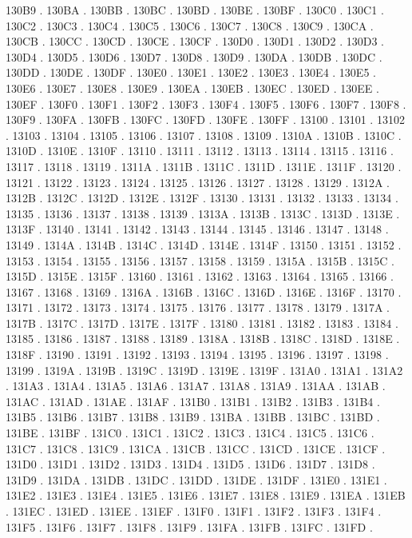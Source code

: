 130B9 .
130BA .
130BB .
130BC .
130BD .
130BE .
130BF .
130C0 .
130C1 .
130C2 .
130C3 .
130C4 .
130C5 .
130C6 .
130C7 .
130C8 .
130C9 .
130CA .
130CB .
130CC .
130CD .
130CE .
130CF .
130D0 .
130D1 .
130D2 .
130D3 .
130D4 .
130D5 .
130D6 .
130D7 .
130D8 .
130D9 .
130DA .
130DB .
130DC .
130DD .
130DE .
130DF .
130E0 .
130E1 .
130E2 .
130E3 .
130E4 .
130E5 .
130E6 .
130E7 .
130E8 .
130E9 .
130EA .
130EB .
130EC .
130ED .
130EE .
130EF .
130F0 .
130F1 .
130F2 .
130F3 .
130F4 .
130F5 .
130F6 .
130F7 .
130F8 .
130F9 .
130FA .
130FB .
130FC .
130FD .
130FE .
130FF .
13100 .
13101 .
13102 .
13103 .
13104 .
13105 .
13106 .
13107 .
13108 .
13109 .
1310A .
1310B .
1310C .
1310D .
1310E .
1310F .
13110 .
13111 .
13112 .
13113 .
13114 .
13115 .
13116 .
13117 .
13118 .
13119 .
1311A .
1311B .
1311C .
1311D .
1311E .
1311F .
13120 .
13121 .
13122 .
13123 .
13124 .
13125 .
13126 .
13127 .
13128 .
13129 .
1312A .
1312B .
1312C .
1312D .
1312E .
1312F .
13130 .
13131 .
13132 .
13133 .
13134 .
13135 .
13136 .
13137 .
13138 .
13139 .
1313A .
1313B .
1313C .
1313D .
1313E .
1313F .
13140 .
13141 .
13142 .
13143 .
13144 .
13145 .
13146 .
13147 .
13148 .
13149 .
1314A .
1314B .
1314C .
1314D .
1314E .
1314F .
13150 .
13151 .
13152 .
13153 .
13154 .
13155 .
13156 .
13157 .
13158 .
13159 .
1315A .
1315B .
1315C .
1315D .
1315E .
1315F .
13160 .
13161 .
13162 .
13163 .
13164 .
13165 .
13166 .
13167 .
13168 .
13169 .
1316A .
1316B .
1316C .
1316D .
1316E .
1316F .
13170 .
13171 .
13172 .
13173 .
13174 .
13175 .
13176 .
13177 .
13178 .
13179 .
1317A .
1317B .
1317C .
1317D .
1317E .
1317F .
13180 .
13181 .
13182 .
13183 .
13184 .
13185 .
13186 .
13187 .
13188 .
13189 .
1318A .
1318B .
1318C .
1318D .
1318E .
1318F .
13190 .
13191 .
13192 .
13193 .
13194 .
13195 .
13196 .
13197 .
13198 .
13199 .
1319A .
1319B .
1319C .
1319D .
1319E .
1319F .
131A0 .
131A1 .
131A2 .
131A3 .
131A4 .
131A5 .
131A6 .
131A7 .
131A8 .
131A9 .
131AA .
131AB .
131AC .
131AD .
131AE .
131AF .
131B0 .
131B1 .
131B2 .
131B3 .
131B4 .
131B5 .
131B6 .
131B7 .
131B8 .
131B9 .
131BA .
131BB .
131BC .
131BD .
131BE .
131BF .
131C0 .
131C1 .
131C2 .
131C3 .
131C4 .
131C5 .
131C6 .
131C7 .
131C8 .
131C9 .
131CA .
131CB .
131CC .
131CD .
131CE .
131CF .
131D0 .
131D1 .
131D2 .
131D3 .
131D4 .
131D5 .
131D6 .
131D7 .
131D8 .
131D9 .
131DA .
131DB .
131DC .
131DD .
131DE .
131DF .
131E0 .
131E1 .
131E2 .
131E3 .
131E4 .
131E5 .
131E6 .
131E7 .
131E8 .
131E9 .
131EA .
131EB .
131EC .
131ED .
131EE .
131EF .
131F0 .
131F1 .
131F2 .
131F3 .
131F4 .
131F5 .
131F6 .
131F7 .
131F8 .
131F9 .
131FA .
131FB .
131FC .
131FD .
